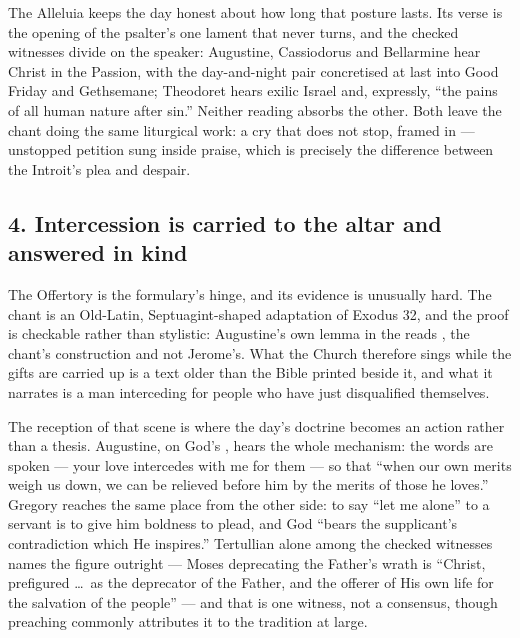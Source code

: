 The Alleluia keeps the day honest about how long that posture lasts. Its verse
is the opening of the psalter's one lament that never turns, and the checked
witnesses divide on the speaker: Augustine, Cassiodorus and Bellarmine hear
Christ in the Passion, with the day-and-night pair concretised at last into
Good Friday and Gethsemane; Theodoret hears exilic Israel and, expressly,
``the pains of all human nature after sin.'' Neither reading absorbs the
other. Both leave the chant doing the same liturgical work: a cry
that does not stop, framed in  --- unstopped petition sung
inside praise, which is precisely the difference between the Introit's plea
and despair.

\subsection*{4. Intercession is carried to the altar and answered in kind}

The Offertory is the formulary's hinge, and its evidence is unusually hard.
The chant is an Old-Latin, Septuagint-shaped adaptation of Exodus 32, and the
proof is checkable rather than stylistic: Augustine's own lemma in the
 reads , the chant's construction and not Jerome's. What the Church
therefore sings while the gifts are carried up is a text older than the Bible
printed beside it, and what it narrates is a man interceding for people who
have just disqualified themselves.

The reception of that scene is where the day's doctrine becomes an action
rather than a thesis. Augustine, on God's , hears the whole
mechanism: the words are spoken  --- your love intercedes with me for them --- so that
``when our own merits weigh us down, we can be relieved before him by the
merits of those he loves.'' Gregory reaches the same place from the other
side: to say ``let me alone'' to a servant is to give him boldness to plead,
and God ``bears the supplicant's contradiction which He inspires.'' Tertullian
alone among the checked witnesses names the figure outright --- Moses
deprecating the Father's wrath is ``Christ, prefigured \dots\ as the
deprecator of the Father, and the offerer of His own life for the salvation
of the people'' --- and that is one witness, not a consensus, though
preaching commonly attributes it to the tradition at large.

